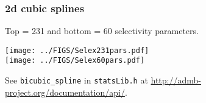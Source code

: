 \documentclass[table]{beamer}
\begin{document}
\begin{frame}[t]\frametitle{2d cubic splines}
    Top = 231 and bottom = 60 selectivity parameters.
	\begin{center}
		\vspace{-0.15in}
		\texttt{[image: ../FIGS/Selex231pars.pdf]}\\
		\vspace{-0.4in}
		\texttt{[image: ../FIGS/Selex60pars.pdf]}
	\end{center}
	\vspace{-2.1in}
	See \texttt{bicubic\_spline}  in \texttt{statsLib.h}  at \url{http://admb-project.org/documentation/api/}.
\end{frame}

%

\end{document}
